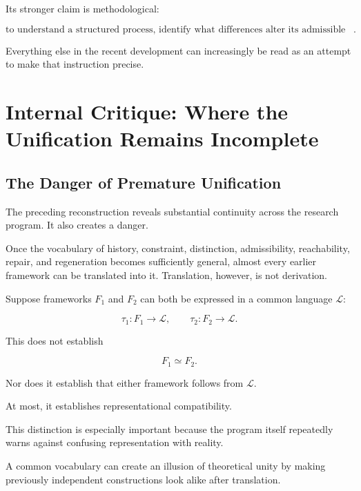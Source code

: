 \documentclass[11pt]{article}
\theoremstyle{remark}
\begin{document}
Its stronger claim is methodological:

\begin{equation}
\boxed{
\text{to understand a structured process, identify what differences alter its admissible continuations, and test whether your representation preserves them}.
}
\end{equation}

Everything else in the recent development can increasingly be read as an attempt to make that instruction precise.

\section{Internal Critique: Where the Unification Remains Incomplete}

\subsection{The Danger of Premature Unification}

The preceding reconstruction reveals substantial continuity across the research program. It also creates a danger.

Once the vocabulary of history, constraint, distinction, admissibility, reachability, repair, and regeneration becomes sufficiently general, almost every earlier framework can be translated into it. Translation, however, is not derivation.

Suppose frameworks $F_1$ and $F_2$ can both be expressed in a common language $\mathcal{L}$:

\begin{equation}
\tau_1:F_1\rightarrow\mathcal{L},
\qquad
\tau_2:F_2\rightarrow\mathcal{L}.
\end{equation}

This does not establish

\begin{equation}
F_1\simeq F_2.
\end{equation}

Nor does it establish that either framework follows from $\mathcal{L}$.

At most, it establishes representational compatibility.

This distinction is especially important because the program itself repeatedly warns against confusing representation with reality.

A common vocabulary can create an illusion of theoretical unity by making previously independent constructions look alike after translation.
\end{document}
